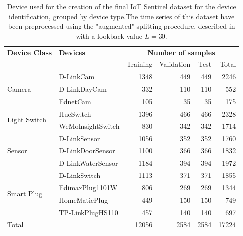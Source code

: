 \begin{table}[t]
\centering
\begin{tabular}{llrrrr}
\toprule
\textbf{Device Class} & \textbf{Devices} & \multicolumn{4}{c}{\textbf{Number of samples}} \\
& & Training & Validation & Test & Total \\
\midrule
\multirow{3}{*}{Camera}  & D-LinkCam     & 1348 & 449 & 449 & 2246  \\
                         & D-LinkDayCam  & 332 & 110 & 110 & 552  \\
                         & EdnetCam      & 105 & 35 & 35 & 175  \\
\midrule
\multirow{2}{*}{Light Switch} & HueSwitch & 1396 & 466 & 466 & 2328 \\
                             &  WeMoInsightSwitch & 830 & 342 & 342 & 1714  \\
\midrule
\multirow{3}{*}{Sensor} &  D-LinkSensor  & 1056 & 352 & 352 & 1760 \\
                         & D-LinkDoorSensor  & 1100 & 366 & 366 & 1832  \\
                         & D-LinkWaterSensor  & 1184 & 394 & 394 & 1972  \\
\midrule
\multirow{4}{*}{Smart Plug}& D-LinkSwitch  & 1113 & 371 & 371 & 1855 \\
                          & EdimaxPlug1101W & 806 & 269 & 269 & 1344  \\
                          & HomeMaticPlug & 449 & 150 & 150 & 749  \\
                          & TP-LinkPlugHS110 & 457 & 140 & 140 & 697  \\
\midrule
\midrule
Total & & 12056 & 2584 & 2584 & 17224 \\
\bottomrule
\end{tabular}
\caption{Device used for the creation of the final IoT Sentinel dataset for the device identification, grouped by device type.The time series of this dataset have been preprocessed using the "augmented" splitting procedure, described in  with a lookback value $L=30$.}\label{tab:iotdev}
\vspace{12cm}
\end{table}


